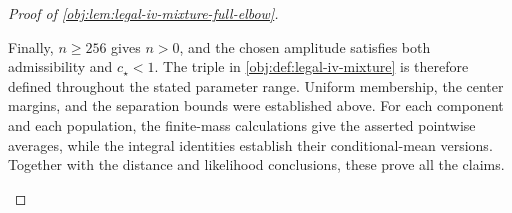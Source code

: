 \begin{proof}[Proof of \cref{obj:lem:legal-iv-mixture-full-elbow}]
\begin{enumerate}
Finally, \(n\ge256\) gives \(n>0\), and the chosen amplitude satisfies both admissibility and \(c_{\star}<1\). The triple in
\cref{obj:def:legal-iv-mixture} is therefore defined throughout the stated parameter range. Uniform membership, the center margins, and the separation bounds were established above. For each component and each population, the finite-mass calculations give the asserted pointwise averages, while the integral identities establish their conditional-mean versions. Together with the distance and likelihood conclusions, these prove all the claims.
\end{enumerate}
\end{proof}
